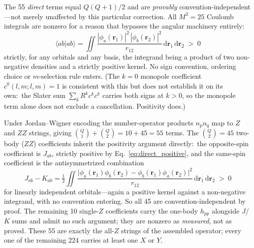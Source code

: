 \documentclass[aps,pra,twocolumn,superscriptaddress,longbibliography]{revtex4-2}
\begin{document}
The 55 \emph{direct} terms equal $Q(Q+1)/2$ and are \emph{provably}
convention-independent---not merely unaffected by this particular
correction.  All $M^2 = 25$ Coulomb integrals are nonzero for a reason that
bypasses the angular machinery entirely:
\begin{equation}
  \langle ab | ab \rangle
  = \iint \frac{|\phi_a(\mathbf{r}_1)|^2\,|\phi_b(\mathbf{r}_2)|^2}
               {r_{12}}\,
    \mathrm{d}\mathbf{r}_1\,\mathrm{d}\mathbf{r}_2 \;>\; 0
  \label{eq:direct_positive}
\end{equation}
strictly, for any orbitals and any basis, the integrand being a product of
two non-negative densities and a strictly positive kernel.  No sign
convention, ordering choice or $m$-selection rule enters.  (The $k=0$
monopole coefficient $c^0(l,m;l,m) = 1$ is consistent with this but does not
establish it on its own:\ the Slater sum $\sum_k R^k c^k c^k$ carries both
signs at $k > 0$, so the monopole term alone does not exclude a
cancellation.  Positivity does.)

Under Jordan--Wigner encoding the number-operator products $n_p n_q$ map to
$Z$ and $ZZ$ strings, giving $\binom{Q}{1} + \binom{Q}{2} = 10 + 45 = 55$
terms.  The $\binom{Q}{2} = 45$ two-body ($ZZ$) coefficients inherit the
positivity argument directly:\ the opposite-spin coefficient is $J_{ab}$,
strictly positive by Eq.~\eqref{eq:direct_positive}, and the same-spin
coefficient is the antisymmetrized combination
\begin{equation}
  J_{ab} - K_{ab}
  = \tfrac{1}{2}\iint
    \frac{\bigl|\phi_a(\mathbf{r}_1)\phi_b(\mathbf{r}_2)
               - \phi_b(\mathbf{r}_1)\phi_a(\mathbf{r}_2)\bigr|^2}{r_{12}}
    \,\mathrm{d}\mathbf{r}_1\,\mathrm{d}\mathbf{r}_2 \;>\; 0
  \label{eq:exchange_positive}
\end{equation}
for linearly independent orbitals---again a positive kernel against a
non-negative integrand, with no convention entering.  So all 45 are
convention-independent by proof.  The remaining 10 single-$Z$ coefficients
carry the one-body $h_{pp}$ alongside $J$/$K$ sums and admit no such
argument; they are nonzero as \emph{measured}, not as proved.  These 55 are
exactly the all-$Z$ strings of the assembled operator; every one of the
remaining 224 carries at least one $X$ or $Y$.
\end{document}
